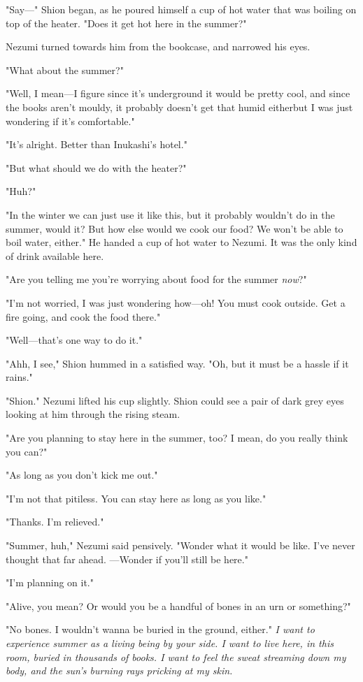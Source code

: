 "Say---" Shion began, as he poured himself a cup of hot water that was
boiling on top of the heater. "Does it get hot here in the summer?"

Nezumi turned towards him from the bookcase, and narrowed his eyes.

"What about the summer?"

"Well, I mean---I figure since it's underground it would be pretty cool,
and since the books aren't mouldy, it probably doesn't get that humid
either\el but I was just wondering if it's comfortable."

"It's alright. Better than Inukashi's hotel."

"But what should we do with the heater?"

"Huh?"

"In the winter we can just use it like this, but it probably wouldn't do
in the summer, would it? But how else would we cook our food? We won't
be able to boil water, either." He handed a cup of hot water to Nezumi.
It was the only kind of drink available here.

"Are you telling me you're worrying about food for the summer \emph{now}?"

"I'm not worried, I was just wondering how---oh! You must cook outside.
Get a fire going, and cook the food there."

"Well---that's one way to do it."

"Ahh, I see," Shion hummed in a satisfied way. "Oh, but it must be a
hassle if it rains."

"Shion." Nezumi lifted his cup slightly. Shion could see a pair of dark
grey eyes looking at him through the rising steam.

"Are you planning to stay here in the summer, too? I mean, do you really
think you can?"

"As long as you don't kick me out."

"I'm not that pitiless. You can stay here as long as you like."

"Thanks. I'm relieved."

"Summer, huh," Nezumi said pensively. "Wonder what it would be like.
I've never thought that far ahead. ---Wonder if you'll still be here."

"I'm planning on it."

"Alive, you mean? Or would you be a handful of bones in an urn or
something?"

"No bones. I wouldn't wanna be buried in the ground, either." \emph{I want to
experience summer as a living being by your side. I want to live here,
in this room, buried in thousands of books. I want to feel the sweat
streaming down my body, and the sun's burning rays pricking at my skin.}

